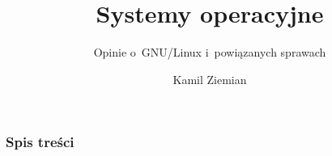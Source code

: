 \documentclass[10pt,t]{beamer}
\title{Systemy operacyjne}
\subtitle{Opinie o~GNU/Linux i~powiązanych sprawach}
\author{Kamil Ziemian}
\date{}
\begin{document}





\RaggedRight





\maketitle





\begin{frame}
  \frametitle{Spis treści}


  \tableofcontents

\end{frame}































\end{document}

